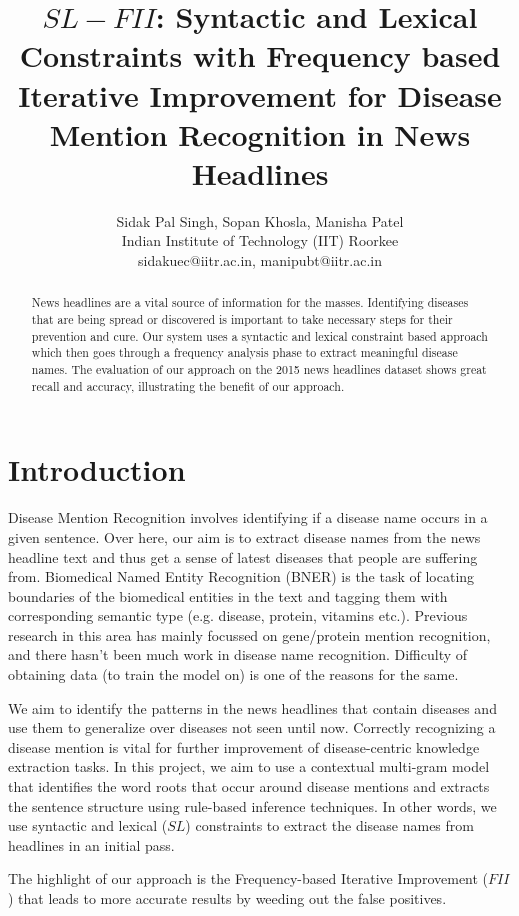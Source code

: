 \documentclass{article}
\title{$SL-FII$: Syntactic and Lexical Constraints with Frequency based Iterative Improvement for Disease Mention Recognition in News Headlines}
\author{Sidak Pal Singh, Sopan Khosla, Manisha Patel \\ 
Indian Institute of Technology (IIT) Roorkee  \\
sidakuec@iitr.ac.in, manipubt@iitr.ac.in}
\begin{document}
\maketitle

\begin{abstract}
  News headlines are a vital source of information for the masses. Identifying diseases that are being spread or discovered is important to take necessary steps for their prevention and cure. Our system uses a syntactic and lexical constraint based approach which then goes through a frequency analysis phase to extract meaningful disease names. The evaluation of our approach on the 2015 news headlines dataset shows great recall and accuracy, illustrating the benefit of our approach. 
\end{abstract}

\section{Introduction}

Disease Mention Recognition involves identifying if a disease name occurs in a given
sentence. Over here, our aim is to extract disease names from the news headline text
and thus get a sense of latest diseases that people are suffering from. Biomedical Named
Entity Recognition (BNER) is the task of locating boundaries of the biomedical entities in
the text and tagging them with corresponding semantic type (e.g. disease, protein,
vitamins etc.). Previous research in this area has mainly focussed on gene/protein
mention recognition, and there hasn’t been much work in disease name recognition.
Difficulty of obtaining data (to train the model on) is one of the reasons for the same.

We aim to identify the patterns in the news headlines that contain diseases and use them
to generalize over diseases not seen until now. Correctly recognizing a disease mention is vital for further improvement of disease-centric knowledge extraction tasks. In this
project, we aim to use a contextual multi-gram model that identifies the word roots that
occur around disease mentions and extracts the sentence structure using rule-based
inference techniques. In other words, we use syntactic and lexical ($SL$) constraints to extract the disease names from headlines in an initial pass.  

The highlight of our approach is the ​Frequency-based Iterative Improvement ($FII$) that leads to more accurate results by weeding out the false positives.
\end{document}
